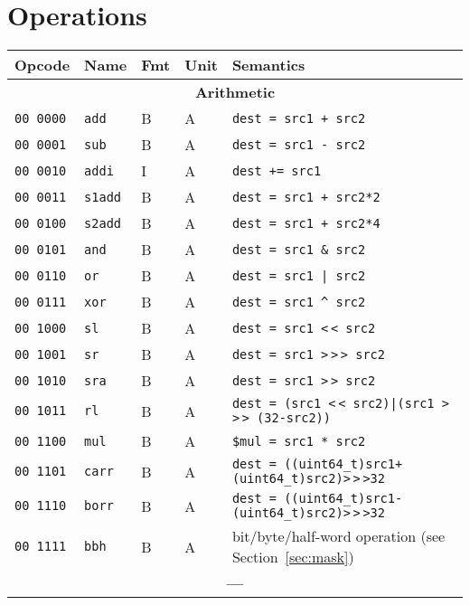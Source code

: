 \documentclass[10pt,DIV12]{scrartcl}
\newcommand{\shl}{\textless$\,\!$\textless}
\newcommand{\shr}{\textgreater$\,\!$\textgreater$\,\!$\textgreater}
\newcommand{\ashr}{\textgreater$\,\!$\textgreater}
\begin{document}
\pagebreak

\section{Operations}

\begin{longtable}{llllp{}}
\toprule
Opcode & Name & Fmt & Unit & Semantics \\
\midrule
\multicolumn{5}{c}{\textsf{\textbf{Arithmetic}}} \\
\cmidrule{1-5}
\texttt{00 0000} & \texttt{add} & B & A & \texttt{dest = src1 + src2} \\
\texttt{00 0001} & \texttt{sub} & B & A & \texttt{dest = src1 - src2} \\
\texttt{00 0010} & \texttt{addi} & I & A & \texttt{dest += src1} \\
\texttt{00 0011} & \texttt{s1add} & B & A & \texttt{dest = src1 + src2*2} \\
\texttt{00 0100} & \texttt{s2add} & B & A & \texttt{dest = src1 + src2*4} \\
\texttt{00 0101} & \texttt{and} & B & A & \texttt{dest = src1 \& src2} \\
\texttt{00 0110} & \texttt{or} & B & A & \texttt{dest = src1 | src2} \\
\texttt{00 0111} & \texttt{xor} & B & A & \texttt{dest = src1 \textasciicircum{} src2} \\
\texttt{00 1000} & \texttt{sl} & B & A & \texttt{dest = src1 \shl{} src2} \\
\texttt{00 1001} & \texttt{sr} & B & A & \texttt{dest = src1 \shr{} src2} \\
\texttt{00 1010} & \texttt{sra} & B & A & \texttt{dest = src1 \ashr{} src2} \\
\texttt{00 1011} & \texttt{rl} & B & A & \texttt{dest = (src1 \shl{} src2)|(src1 \shr{} (32-src2))} \\
\texttt{00 1100} & \texttt{mul} & B & A & \texttt{\$mul = src1 * src2} \\
\texttt{00 1101} & \texttt{carr} & B & A & \texttt{dest = ((uint64\_t)src1+(uint64\_t)src2)\shr{}32} \\
\texttt{00 1110} & \texttt{borr} & B & A & \texttt{dest = ((uint64\_t)src1-(uint64\_t)src2)\shr{}32} \\
\texttt{00 1111} & \texttt{bbh} & B & A & bit/byte/half-word operation (see Section~\ref{sec:mask}) \\
\midrule
\multicolumn{5}{c}{\textbf{---}} \\

\end{longtable}
\end{document}
